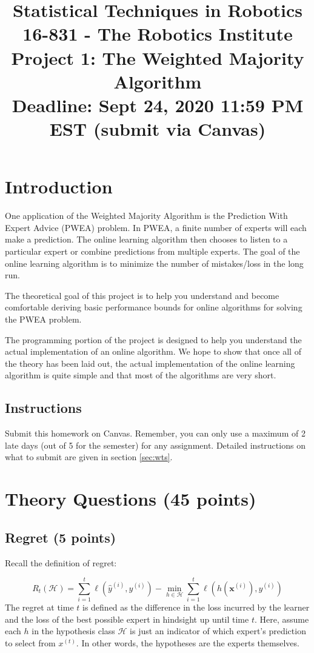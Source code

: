 \documentclass{article}
\title
{ 
{\small Statistical Techniques in Robotics 16-831 - The Robotics Institute} \\
Project 1: The Weighted Majority Algorithm \\
{\large Deadline: Sept 24, 2020 11:59 PM EST (submit via Canvas)}}
\date{}
\begin{document}
\maketitle

\section{Introduction}

One application of the Weighted Majority Algorithm is the Prediction With Expert Advice (PWEA) problem. In PWEA, a finite number of experts will each make a prediction. The online learning algorithm then chooses to listen to a particular expert or combine predictions from multiple experts. The goal of the online learning algorithm is to minimize the number of mistakes/loss in the long run. %

The theoretical goal of this project is to help you understand and become comfortable deriving basic performance bounds for online algorithms for solving the PWEA problem.

The programming portion of the project is designed to help you understand the actual implementation of an online algorithm. We hope to show that once all of the theory has been laid out, the actual implementation of the online learning algorithm is quite simple and that most of the algorithms are very short.

\subsection{Instructions}
Submit this homework on Canvas. Remember, you can only use a maximum of 2 late days (out of 5 for the semester) for any assignment.
Detailed instructions on what to submit are given in section \ref{sec:wts}.

\section{Theory Questions (45 points)}
\subsection{Regret (5 points)}

Recall the definition of regret:

\begin{equation}
        R_t(\mathcal{H}) = \sum_{i = 1}^t \ell(\hat y^{(i)}, y^{(i)}) - \min_{h \in \mathcal{H}}\sum_{i=1}^t \ell(h(\mathbf{x}^{(i)}), y^{(i)}) \nonumber
\end{equation}
The regret at time $t$ is defined as the difference in the loss incurred by the learner and the loss of the best possible expert in hindsight up until time $t$. Here, assume each $h$ in the hypothesis class $\mathcal{H}$ is just an indicator of which expert's prediction to select from $x^{(t)}$. In other words, the hypotheses are the experts themselves.
\end{document}
